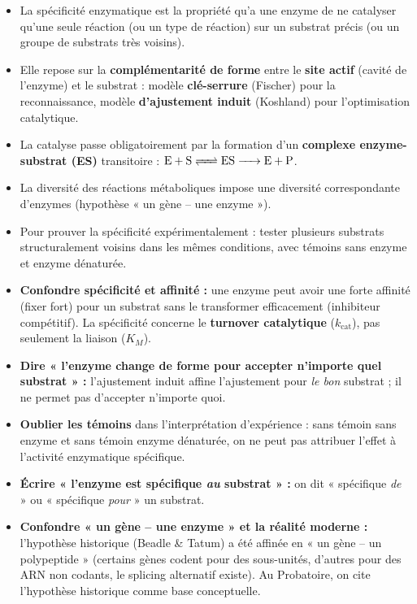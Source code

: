 \documentclass[11pt]{article}
\newcommand{\cle}[1]{{\popxbold\color{popdark}#1}}
\newcounter{popsec}
\newcounter{popsub}
\newcommand{\courssub}[1]{%
  \stepcounter{popsub}%
  \par\vspace{9pt}\noindent{\popxbold\fontsize{11.5}{13}\selectfont\color{popink}{\color{poporange}\thepopsec.\thepopsub}\hspace{6pt}#1}\par\nopagebreak\vspace{4pt}
}
\begin{document}
\courssub{Synthèse de la section}

\begin{aretenir}
\begin{itemize}
    \item La \cle{spécificité enzymatique} est la propriété qu'a une enzyme de ne catalyser qu'une seule réaction (ou un type de réaction) sur un substrat précis (ou un groupe de substrats très voisins).
    \item Elle repose sur la \textbf{complémentarité de forme} entre le \textbf{site actif} (cavité de l'enzyme) et le substrat : modèle \textbf{clé-serrure} (Fischer) pour la reconnaissance, modèle \textbf{d'ajustement induit} (Koshland) pour l'optimisation catalytique.
    \item La catalyse passe obligatoirement par la formation d'un \textbf{complexe enzyme-substrat (ES)} transitoire : $\ce{E + S <=> ES -> E + P}$.
    \item La diversité des réactions métaboliques impose une diversité correspondante d'enzymes (hypothèse « un gène – une enzyme »).
    \item Pour prouver la spécificité expérimentalement : tester plusieurs substrats structuralement voisins dans les mêmes conditions, avec témoins sans enzyme et enzyme dénaturée.
\end{itemize}
\end{aretenir}

\begin{attention}
\begin{itemize}
    \item \textbf{Confondre spécificité et affinité :} une enzyme peut avoir une forte affinité (fixer fort) pour un substrat sans le transformer efficacement (inhibiteur compétitif). La spécificité concerne le \textbf{turnover catalytique} ($k_{\text{cat}}$), pas seulement la liaison ($K_M$).
    \item \textbf{Dire « l'enzyme change de forme pour accepter n'importe quel substrat » :} l'ajustement induit affine l'ajustement pour \emph{le bon} substrat ; il ne permet pas d'accepter n'importe quoi.
    \item \textbf{Oublier les témoins} dans l'interprétation d'expérience : sans témoin sans enzyme et sans témoin enzyme dénaturée, on ne peut pas attribuer l'effet à l'activité enzymatique spécifique.
    \item \textbf{Écrire « l'enzyme est spécifique \emph{au} substrat » :} on dit « spécifique \emph{de} » ou « spécifique \emph{pour} » un substrat.
    \item \textbf{Confondre « un gène – une enzyme » et la réalité moderne :} l'hypothèse historique (Beadle \& Tatum) a été affinée en « un gène – un polypeptide » (certains gènes codent pour des sous-unités, d'autres pour des ARN non codants, le splicing alternatif existe). Au Probatoire, on cite l'hypothèse historique comme base conceptuelle.
\end{itemize}
\end{attention}
\end{document}

